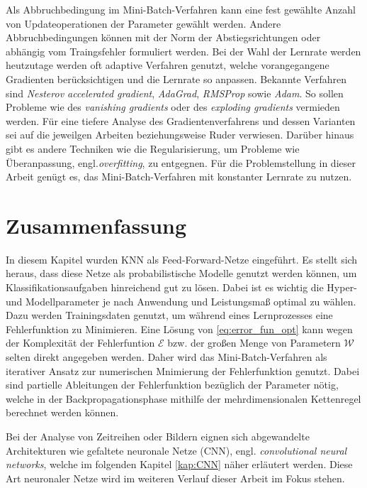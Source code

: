Als Abbruchbedingung im Mini-Batch-Verfahren kann eine fest gewählte Anzahl von Updateoperationen der Parameter gewählt werden. Andere Abbruchbedingungen können mit der Norm der Abstiegsrichtungen\cite{bishop2006pattern} oder abhängig vom Traingsfehler formuliert werden. Bei der Wahl der Lernrate werden heutzutage werden oft adaptive Verfahren genutzt, welche vorangegangene Gradienten berücksichtigen und die Lernrate so anpassen. Bekannte Verfahren sind \textit{Nesterov accelerated
gradient}\cite{sutskever2013importance}, \textit{AdaGrad}\cite{duchi2011adaptive}, \textit{RMSProp}\cite{tieleman2012lecture} sowie \textit{Adam}\cite{Kingma2015AdamAM}. So sollen Probleme wie des \textit{vanishing gradients} oder des \textit{exploding gradients} vermieden werden\cite{hanin2018neural}.
Für eine tiefere Analyse des Gradientenverfahrens und dessen Varianten sei auf die jeweilgen Arbeiten beziehungsweise Ruder\cite{ruder2016overview,} verwiesen. Darüber hinaus gibt es andere Techniken wie die Regularisierung, um Probleme wie Überanpassung, engl.\textit{overfitting}, zu entgegnen.
Für die Problemstellung in dieser Arbeit genügt es, das Mini-Batch-Verfahren mit konstanter Lernrate zu nutzen. 



\section{Zusammenfassung}
\label{abs:NN_conc}
In diesem Kapitel wurden KNN als Feed-Forward-Netze eingeführt. Es stellt sich heraus, dass diese Netze als probabilistische Modelle genutzt werden können, um Klassifikationsaufgaben hinreichend gut zu lösen. Dabei ist es wichtig die Hyper- und Modellparameter je nach Anwendung und Leistungsmaß optimal zu wählen. Dazu werden Trainingsdaten genutzt, um während eines Lernprozesses eine Fehlerfunktion zu Minimieren. Eine Lösung von \ref{eq:error_fun_opt} kann wegen der Komplexität der Fehlerfuntion $\mathcal{E}$ bzw. der großen Menge von Parametern $\mathcal{W}$ selten direkt angegeben werden\cite{blum1992training}. Daher wird das Mini-Batch-Verfahren als iterativer Ansatz zur numerischen Mnimierung der Fehlerfunktion genutzt. Dabei sind partielle Ableitungen der Fehlerfunktion bezüglich der Parameter nötig, welche in der Backpropagationsphase mithilfe der mehrdimensionalen Kettenregel berechnet werden können. 

Bei der Analyse von Zeitreihen oder Bildern eignen sich abgewandelte Architekturen wie gefaltete neuronale Netze (CNN), engl. \textit{convolutional neural networks}, welche im folgenden Kapitel \ref{kap:CNN} näher erläutert werden. Diese Art neuronaler Netze wird im weiteren Verlauf dieser Arbeit im Fokus stehen.


    





